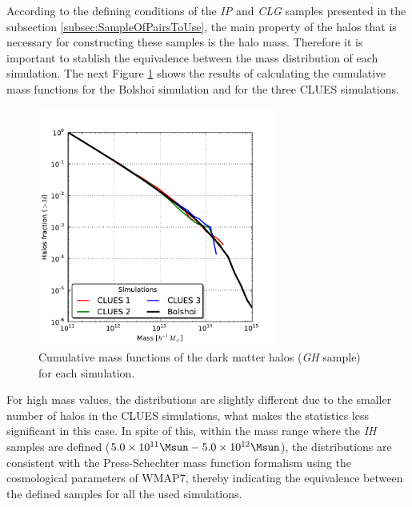 According to the defining conditions of the \textit{IP} and \textit{CLG} 
samples presented in the subsection \ref{subsec:SampleOfPairsToUse}, the
main property of the halos that is necessary for cons\-tructing these samples
is the halo mass. Therefore it is important to stablish the equivalence 
between the mass distribution of each simulation. The next Figure 
\ref{fig:IMF} shows the results of calculating the cumulative mass 
functions for the Bolshoi simulation and for the three CLUES simulations.


\begin{figure}[htbp]
	\centering
	\includegraphics[width=0.70\textwidth]
	{./figures/4_results/Halos_IMF.pdf}
	
	\caption{\small{Cumulative mass functions of the dark matter halos
	(\textit{GH} sample) for each simulation.}}
	\label{fig:IMF}
\end{figure}


For high mass values, the distributions are slightly different due to the 
smaller number of halos in the CLUES simulations, what makes the statistics
less significant in this case. In spite of this, within the mass range 
where the \textit{IH} samples are defined ($5.0 \times 10^{11}\Msun - 
5.0\times 10 ^{12}\Msun$), the distributions are consistent with the 
Press-Schechter mass function formalism \cite{press1974} using the 
cosmological parameters of WMAP7, thereby indicating the equivalence 
between the defined samples for all the used simulations.




